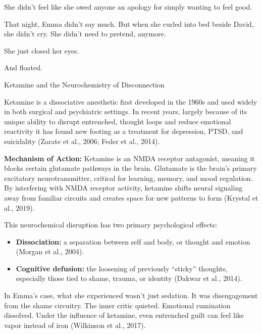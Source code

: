 She didn’t feel like she owed anyone an apology for simply wanting to feel good.

That night, Emma didn’t say much. But when she curled into bed beside David, she didn’t cry.
She didn’t need to pretend, anymore.

She just closed her eyes.

And floated.

\medskip

\begin{TechnicalSidebar}{Ketamine and the Neurochemistry of Disconnection}

  Ketamine is a dissociative anesthetic first developed in the 1960s and used widely in both 
  surgical and psychiatric settings. In recent years, 
  largely because of its unique ability to disrupt entrenched,
  thought loops and reduce emotional reactivity
  it has found new footing as a treatment for 
  depression, PTSD, and suicidality (Zarate et al., 2006; Feder et al., 2014).

  \medskip

  \textbf{Mechanism of Action:}  
  Ketamine is an NMDA receptor antagonist, meaning it blocks certain glutamate pathways in the brain.  
  Glutamate is the brain’s primary excitatory neurotransmitter, critical for learning, memory, and mood 
  regulation. By interfering with NMDA receptor activity, ketamine shifts neural signaling away from 
  familiar circuits and creates space for new patterns to form (Krystal et al., 2019).

  \medskip

  This neurochemical disruption has two primary psychological effects:

  \begin{itemize}
    \item \textbf{Dissociation:} a separation between self and body, or thought and emotion (Morgan et al., 2004).
    \item \textbf{Cognitive defusion:} the loosening of previously “sticky” thoughts, especially those tied 
    to shame, trauma, or identity (Dakwar et al., 2014).
  \end{itemize}

  \medskip

  In Emma’s case, what she experienced wasn’t just sedation.  
  It was disengagement from the shame circuitry.  
  The inner critic quieted. Emotional rumination dissolved.  
  Under the influence of ketamine, even entrenched guilt can feel like vapor instead of iron 
  (Wilkinson et al., 2017).


\end{TechnicalSidebar}
